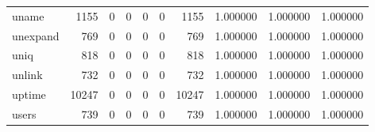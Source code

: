 \begin{tabular}{lrrrrrrrrr}
uname     &                                               1155 &                                                  0 &                                                  0 &                                                  0 &                                                  0 &                                               1155 &                                           1.000000 &                               1.000000 &                             1.000000 \\
unexpand  &                                                769 &                                                  0 &                                                  0 &                                                  0 &                                                  0 &                                                769 &                                           1.000000 &                               1.000000 &                             1.000000 \\
uniq      &                                                818 &                                                  0 &                                                  0 &                                                  0 &                                                  0 &                                                818 &                                           1.000000 &                               1.000000 &                             1.000000 \\
unlink    &                                                732 &                                                  0 &                                                  0 &                                                  0 &                                                  0 &                                                732 &                                           1.000000 &                               1.000000 &                             1.000000 \\
uptime    &                                              10247 &                                                  0 &                                                  0 &                                                  0 &                                                  0 &                                              10247 &                                           1.000000 &                               1.000000 &                             1.000000 \\
users     &                                                739 &                                                  0 &                                                  0 &                                                  0 &                                                  0 &                                                739 &                                           1.000000 &                               1.000000 &                             1.000000 \\

\end{tabular}
